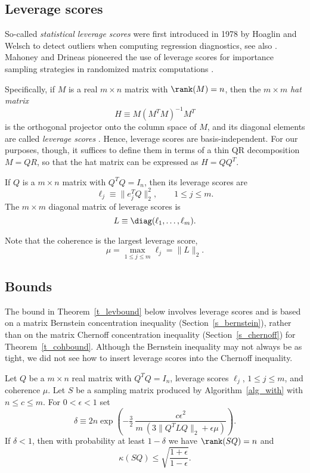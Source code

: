 \documentclass{siamltex}
\begin{document}
\subsection{Leverage scores}\label{s_levscore}
So-called \textit{statistical leverage scores} were first introduced
in 1978 by Hoaglin and Welsch \cite{HoagW78} to detect outliers when
computing regression diagnostics, see also
\cite{ChatterH86,VelleW81}. Mahoney and Drineas pioneered the use
of leverage scores for importance sampling strategies in randomized
matrix computations \cite{Mah11}.

Specifically, 
if $M$ is a real $m\times n$ matrix with $\rank(M)=n$, then the 
$m\times m$  \textit{hat matrix} 
$$H\equiv M(M^TM)^{-1}M^T$$ is the orthogonal
projector onto the column space of $M$, and its diagonal elements 
are called \textit{leverage scores} \cite[Section~2]{HoagW78}.
Hence, leverage scores are basis-independent. For our
purposes, though, it suffices to define them in terms of a thin QR
decomposition $M=QR$, so that the hat matrix can be expressed
as $H=QQ^T$. 

\begin{definition}
If $Q$ is a $m\times n$ matrix with $Q^TQ=I_n$, then its
{\rm leverage scores} are
$$\ell_j\equiv \|e_j^TQ\|_2^2, \qquad 1\leq j\leq m.$$
The $m\times m$ diagonal matrix of leverage scores is
$$L\equiv\diag(\ell_1,\ldots,\ell_m).$$
\end{definition}

Note that the coherence is the largest leverage score, 
$$\mu=\max_{1\leq j\leq m}{\ell_j}=\|L\|_2.$$ 

\subsection{Bounds}\label{s_levbound}
The bound in Theorem~\ref{t_levbound} below involves leverage scores and
is based on a matrix Bernstein 
concentration inequality (Section~\ref{s_bernstein}), rather than on 
the matrix Chernoff concentration inequality (Section~\ref{s_chernoff})
for Theorem~\ref{t_cohbound}. Although the Bernstein inequality may not always
be as tight, we did not see how to insert leverage scores into the 
Chernoff inequality.

\begin{theorem}\label{t_levbound}
Let $Q$ be a $m\times n$ real matrix with $Q^TQ=I_n$, leverage scores
$\ell_j$, $1\leq j\leq m$, and coherence $\mu$. Let $S$ be a sampling
matrix produced by Algorithm~\ref{alg_with} with
$n\leq c\leq m$. For  $0<\epsilon<1$ set
$$\delta \equiv 2n\exp\left(-\tfrac{3}{2}\>
\frac{c \epsilon^2}{m\>(3\|Q^TLQ\|_2+\epsilon\mu)}\right).$$
If $\delta<1$, then with probability at least $1-\delta$ we have
$\rank(SQ)=n$ and 
$$\kappa(SQ) \leq \sqrt{\frac{1+\epsilon}{1-\epsilon}}.$$
\end{theorem}
\end{document}
